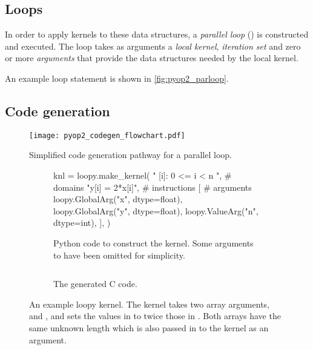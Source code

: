 \documentclass[thesis]{subfiles}
\begin{document}

\subsection{Loops}

In order to apply kernels to these data structures, a \textit{parallel loop} () is constructed and executed.
The loop takes as arguments a \textit{local kernel}, \textit{iteration set} and zero or more \textit{arguments} that provide the data structures needed by the local kernel.




An example loop statement is shown in \cref{fig:pyop2_parloop}.

\subsection{Code generation}
\label{sec:pyop2_codegen}

\begin{figure}
  \texttt{[image: pyop2\_codegen\_flowchart.pdf]}
  \caption{Simplified code generation pathway for a  parallel loop.}
  \label{fig:pyop2_codegen}
\end{figure}

\begin{figure}
  \centering
  \begin{subfigure}{.49\textwidth}
    \begin{pylisting}
      knl = loopy.make_kernel(
        "{ [i]: 0 <= i < n }",  # domains
        "y[i] = 2*x[i]",        # instructions
        [                       # arguments
          loopy.GlobalArg("x", dtype=float),
          loopy.GlobalArg("y", dtype=float),
          loopy.ValueArg("n", dtype=int),
        ],
      )
    \end{pylisting}
    \caption{Python code to construct the kernel. Some arguments to  have been omitted for simplicity.}
    \label{fig:loopy_codegen_kernel}
  \end{subfigure}
  \begin{subfigure}{.49\textwidth}
    \inputminted[fontsize=\footnotesize]{c}{./scripts/artefacts/loopy_example_c_code_tidy.c}
    \caption{The generated C code.}
    \label{fig:loopy_codegen_c}
  \end{subfigure}

  \caption{
    An example loopy kernel.
    The kernel takes two array arguments,  and , and sets the values in  to twice those in .
    Both arrays have the same unknown length  which is also passed in to the kernel as an argument.
  }
  \label{fig:loopy_codegen}
\end{figure}
\end{document}
